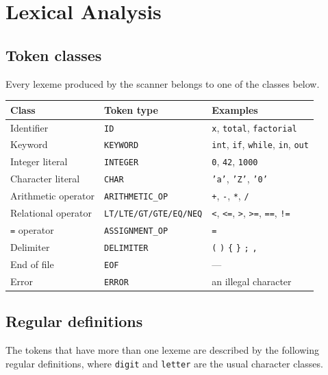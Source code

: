 \documentclass[11pt]{article}
\begin{document}
\section{Lexical Analysis}

\subsection{Token classes}
Every lexeme produced by the scanner belongs to one of the classes below.

\begin{center}
\begin{tabular}{@{}lll@{}}
\toprule
\textbf{Class} & \textbf{Token type} & \textbf{Examples}\\
\midrule
Identifier            & \texttt{ID}            & \texttt{x}, \texttt{total}, \texttt{factorial}\\
Keyword               & \texttt{KEYWORD}       & \texttt{int}, \texttt{if}, \texttt{while}, \texttt{in}, \texttt{out}\\
Integer literal       & \texttt{INTEGER}       & \texttt{0}, \texttt{42}, \texttt{1000}\\
Character literal     & \texttt{CHAR}          & \texttt{'a'}, \texttt{'Z'}, \texttt{'0'}\\
Arithmetic operator   & \texttt{ARITHMETIC\_OP} & \texttt{+}, \texttt{-}, \texttt{*}, \texttt{/}\\
Relational operator   & \texttt{LT/LTE/GT/GTE/EQ/NEQ} & \texttt{<}, \texttt{<=}, \texttt{>}, \texttt{>=}, \texttt{==}, \texttt{!=}\\
\texttt{=} operator   & \texttt{ASSIGNMENT\_OP} & \texttt{=}\\
Delimiter             & \texttt{DELIMITER}     & \texttt{(} \texttt{)} \texttt{\{} \texttt{\}} \texttt{;} \texttt{,}\\
End of file           & \texttt{EOF}           & ---\\
Error                 & \texttt{ERROR}         & an illegal character\\
\bottomrule
\end{tabular}
\end{center}

\subsection{Regular definitions}
The tokens that have more than one lexeme are described by the following
regular definitions, where \texttt{digit} and \texttt{letter} are the usual
character classes.
\end{document}

